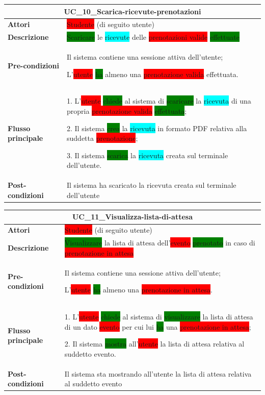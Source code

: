 \documentclass[11pt]{article}
\begin{document}
\begin{table}[H]
\centering
\begin{tabularx}{1\textwidth}{|l|X|}
\hline
\multicolumn{2}{|c|}{\textbf{UC\_10\_Scarica-ricevute-prenotazioni}}\\
\hline \textbf{Attori} & \colorbox{red}{Studente} (di seguito utente)\\
\hline \textbf{Descrizione} & \colorbox{green}{Scaricare} le \colorbox{cyan}{ricevute} delle \colorbox{red}{prenotazioni valide} \colorbox{green}{effettuate}\\
\hline \textbf{Pre-condizioni} & 
Il sistema contiene una sessione attiva dell'utente;

L'\colorbox{red}{utente} \colorbox{green}{ha} almeno una \colorbox{red}{prenotazione valida} effettuata.
\\
\hline \textbf{Flusso principale} & 
1. L'\colorbox{red}{utente} \colorbox{green}{chiede} al sistema di \colorbox{green}{scaricare} la \colorbox{cyan}{ricevuta} di una propria \colorbox{red}{prenotazione valida} \colorbox{green}{effettuata};

2. Il sistema \colorbox{green}{crea} la \colorbox{cyan}{ricevuta} in formato PDF relativa alla suddetta \colorbox{red}{prenotazione};

3. Il sistema \colorbox{green}{scarica} la \colorbox{cyan}{ricevuta} creata sul terminale dell'utente.
\\
\hline \textbf{Post-condizioni} & Il sistema ha scaricato la ricevuta creata sul terminale dell'utente\\
\hline
\end{tabularx}
\end{table}

\begin{table}[H]
\centering
\begin{tabularx}{1\textwidth}{|l|X|}
\hline
\multicolumn{2}{|c|}{\textbf{UC\_11\_Visualizza-lista-di-attesa}}\\
\hline \textbf{Attori} & \colorbox{red}{Studente} (di seguito utente)\\
\hline \textbf{Descrizione} & \colorbox{green}{Visualizzare} la lista di attesa dell'\colorbox{red}{evento} \colorbox{green}{prenotato} in caso di \colorbox{red}{prenotazione in attesa}\\
\hline \textbf{Pre-condizioni} & 
Il sistema contiene una sessione attiva dell'utente;

L'\colorbox{red}{utente} \colorbox{green}{ha} almeno una \colorbox{red}{prenotazione in attesa}.
\\
\hline \textbf{Flusso principale} & 
1. L'\colorbox{red}{utente} \colorbox{green}{chiede} al sistema di \colorbox{green}{visualizzare} la lista di attesa di un dato \colorbox{red}{evento} per cui lui \colorbox{green}{ha} una \colorbox{red}{prenotazione in attesa};

2. Il sistema \colorbox{green}{mostra} all'\colorbox{red}{utente} la lista di attesa relativa al suddetto evento.
\\
\hline \textbf{Post-condizioni} & Il sistema sta mostrando all'utente la lista di attesa relativa al suddetto evento\\
\hline
\end{tabularx}
\end{table}
\end{document}
